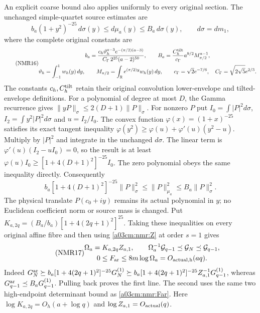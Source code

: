 \documentclass[11pt,a4paper]{article}
\begin{document}
An explicit coarse bound also applies uniformly to every original
section. The unchanged simple-quartet source estimates are
\[
b_a(1+y^2)^{-25}\,d\sigma(y)\leq d\mu_a(y)
\leq B_a\,d\sigma(y),\qquad d\sigma=dm_1,
\]
where the complete original constants are
\begin{equation}\tag{NMR16}\label{a03cm:nmr:source-constants}
\begin{gathered}
b_a=\frac{c_h\vartheta_h^{a-3}e^{-(\pi/2)(a-3)}}
 {C_\Gamma\,2^{25}(a-2)^{50}},\qquad
B_a=\frac{C_h^{\rm tilt}}{c_\Gamma}
                   a^{9/2}M_{\pi/2}^{a-1},\\
\vartheta_h=\int_{-1}^{1}w_h(y)\,dy,\qquad
M_{\pi/2}=\int_{\mathbb R}e^{(\pi/2)y}w_h(y)\,dy,\qquad
c_\Gamma=\sqrt2e^{-7/6},\quad
C_\Gamma=\sqrt{2\sqrt5}e^{2/3}.
\end{gathered}
\end{equation}
The constants $c_h,C_h^{\rm tilt}$ retain their original
convolution lower-envelope and tilted-envelope definitions.
For a polynomial of degree at most $D$, the Gamma recurrence gives
$\|yP\|_\sigma\leq2(D+1)\|P\|_\sigma$.
For nonzero $P$ put $I_0=\int|P|^2d\sigma$,
$I_2=\int y^2|P|^2d\sigma$ and $u=I_2/I_0$.
The convex function $\varphi(x)=(1+x)^{-25}$ satisfies its exact
tangent inequality
$\varphi(y^2)\geq\varphi(u)+\varphi'(u)(y^2-u)$.
Multiply by $|P|^2$ and integrate in the unchanged $d\sigma$.
The linear term is $\varphi'(u)(I_2-uI_0)=0$, so the result is at
least $\varphi(u)I_0\geq[1+4(D+1)^2]^{-25}I_0$.
The zero polynomial obeys the same inequality directly. Consequently
\[
b_a[1+4(D+1)^2]^{-25}\|P\|_\sigma^2
\leq\|P\|_{\mu_a}^2\leq B_a\|P\|_\sigma^2 .
\]
The physical translate $P(c_0+iy)$ remains its actual polynomial
in $y$; no Euclidean coefficient norm or source mass is changed.
Put
$K_{a,2q}=(B_a/b_a)[1+4(2q+1)^2]^{25}$.
Taking these inequalities on every original affine fibre and then
using \eqref{a03cm:nmr:Z} at order $s=1$ gives
\begin{equation}\tag{NMR17}\label{a03cm:nmr:coarse}
\begin{gathered}
\Omega_a=K_{a,2q}Z_{a,1},\qquad
\Omega_a^{-1}\mathcal G_{q-1}\preceq
                 \mathcal G_N\preceq\mathcal G_{q-1},\\
0\leq F_{\rm ar}\leq8m\log\Omega_a=O_{\rm actual,h}(aq).
\end{gathered}
\end{equation}
Indeed $G_N^{\rm ar}\succeq
b_a[1+4(2q+1)^2]^{-25}G_N^{(1)}
\succeq b_a[1+4(2q+1)^2]^{-25}Z_{a,1}^{-1}G_{q-1}^{(1)}$,
whereas $G_{q-1}^{\rm ar}\preceq B_aG_{q-1}^{(1)}$.
Pulling back proves the first line. The second uses the same two
high-endpoint determinant bound as \eqref{a03cm:nmr:Far}.
Here $\log K_{a,2q}=O_h(a+\log q)$ and $\log Z_{a,1}=O_{\rm actual}(q)$.
\end{document}
